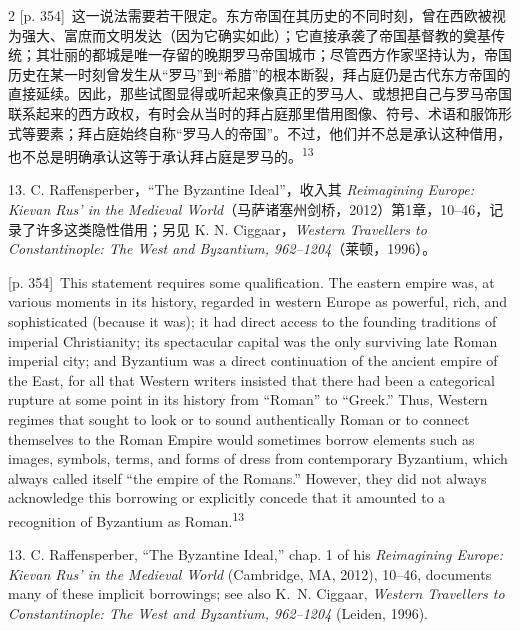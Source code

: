 \documentclass[10pt,a4paper]{article}
\begin{document}
\begin{paracol}{2}
{\scriptsize\color{gray}[p. 354]}\ 这一说法需要若干限定。东方帝国在其历史的不同时刻，曾在西欧被视为强大、富庶而文明发达（因为它确实如此）；它直接承袭了帝国基督教的奠基传统；其壮丽的都城是唯一存留的晚期罗马帝国城市；尽管西方作家坚持认为，帝国历史在某一时刻曾发生从“罗马”到“希腊”的根本断裂，拜占庭仍是古代东方帝国的直接延续。因此，那些试图显得或听起来像真正的罗马人、或想把自己与罗马帝国联系起来的西方政权，有时会从当时的拜占庭那里借用图像、符号、术语和服饰形式等要素；拜占庭始终自称“罗马人的帝国”。不过，他们并不总是承认这种借用，也不总是明确承认这等于承认拜占庭是罗马的。\nobreak\textsuperscript{13}\par{\small 13. C. Raffensperber，“The Byzantine Ideal”，收入其 \textit{Reimagining Europe: Kievan Rus’ in the Medieval World}（马萨诸塞州剑桥，2012）第1章，10–46，记录了许多这类隐性借用；另见 K. N. Ciggaar，\textit{Western Travellers to Constantinople: The West and Byzantium, 962–1204}（莱顿，1996）。\par}
\switchcolumn
{\scriptsize\color{gray}[p. 354]}\ This statement requires some qualification. The eastern empire was, at various moments in its history, regarded in western Europe as powerful, rich, and sophisticated (because it was); it had direct access to the founding traditions of imperial Christianity; its spectacular capital was the only surviving late Roman imperial city; and Byzantium was a direct continuation of the ancient empire of the East, for all that Western writers insisted that there had been a categorical rupture at some point in its history from “Roman” to “Greek.” Thus, Western regimes that sought to look or to sound authentically Roman or to connect themselves to the Roman Empire would sometimes borrow elements such as images, symbols, terms, and forms of dress from contemporary Byzantium, which always called itself “the empire of the Romans.” However, they did not always acknowledge this borrowing or explicitly concede that it amounted to a recognition of Byzantium as Roman.\nobreak\textsuperscript{13}\par{\small 13.  C. Raffensperber, “The Byzantine Ideal,” chap. 1 of his \textit{Reimagining Europe: Kievan Rus’ in the Medieval World} (Cambridge, MA, 2012), 10–46, documents many of these implicit borrowings; see also K. N. Ciggaar, \textit{Western Travellers to Constantinople: The West and Byzantium, 962–1204} (Leiden, 1996).\par}
\switchcolumn*

\end{paracol}
\end{document}
